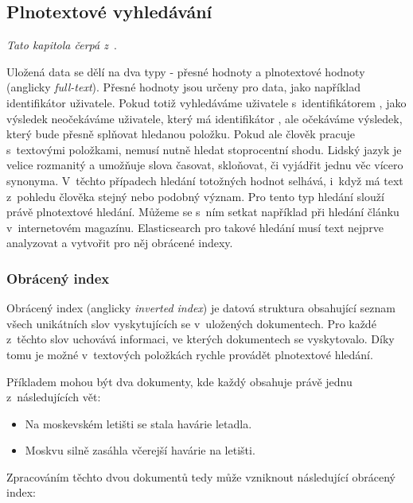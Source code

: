 \subsection{Plnotextové vyhledávání}
\emph{Tato kapitola čerpá z~\cite{bib:elastic-defnitive}}.

Uložená data se dělí na dva typy - přesné hodnoty a plnotextové hodnoty (anglicky \emph{full-text}). Přesné hodnoty jsou určeny pro data, jako například identifikátor uživatele. Pokud totiž vyhledáváme uživatele s~identifikátorem , jako výsledek neočekáváme uživatele, který má identifikátor , ale očekáváme výsledek, který bude přesně splňovat hledanou položku.
Pokud ale člověk pracuje s~textovými položkami, nemusí nutně hledat stoprocentní shodu. Lidský jazyk je velice rozmanitý a umožňuje slova časovat, skloňovat, či vyjádřit jednu věc vícero synonyma. %
V~těchto případech hledání totožných hodnot selhává, i~když má text z~pohledu člověka stejný nebo podobný význam. Pro tento typ hledání slouží právě plnotextové hledání. Můžeme se s~ním setkat například při hledání článku v~internetovém magazínu.
Elasticsearch pro takové hledání musí text nejprve analyzovat a vytvořit pro něj obrácené indexy.

\subsubsection*{Obrácený index}
Obrácený index (anglicky \emph{inverted index}) je datová struktura obsahující seznam všech unikátních slov vyskytujících se v~uložených dokumentech. Pro každé z~těchto slov uchovává informaci, ve kterých dokumentech se vyskytovalo. Díky tomu je možné v~textových položkách rychle provádět plnotextové hledání.

Příkladem mohou být dva dokumenty, kde každý obsahuje právě jednu z~následujících vět:
\begin{itemize}
    \item Na moskevském letišti se stala havárie letadla.
    \item Moskvu silně zasáhla včerejší havárie na letišti.
\end{itemize}
Zpracováním těchto dvou dokumentů tedy může vzniknout následující obrácený index:


